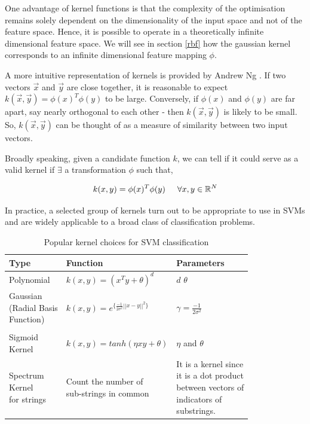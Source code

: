 \documentclass[final,3p,times,twocolumn]{elsarticle}
\begin{document}
One advantage of kernel functions is that the complexity of the optimisation remains solely dependent on the dimensionality of the input space and not of the feature space. Hence, it is possible to operate in a theoretically infinite dimensional feature space. We will see in section \ref{rbf} how the gaussian kernel corresponds to an infinite dimensional feature mapping $\phi$. 

A more intuitive representation of kernels is provided by Andrew Ng . If two vectors $\vec{x}$ and $\vec{y}$ are close together, it is reasonable to expect $k(\vec{x},\vec{y}) = \phi({x})^T\phi({y})$ to be large. Conversely, if $\phi({x})$ and $\phi({y})$ are far apart, say nearly orthogonal to each other - then $k(\vec{x},\vec{y})$  is likely to be small. So, $k(\vec{x},\vec{y})$ can be thought of as a measure of similarity between two input vectors. 

Broadly speaking, given a candidate function $k$, we can tell if it could serve as a valid kernel if $\exists$ a transformation $\phi$ such that, 

\begin{equation}
k(x,y) = \phi(x)^T\phi(y) \hspace{5mm} \forall x,y \in \mathbb{R}^N
\end{equation}

In practice, a selected group of kernels turn out to be appropriate to use in SVMs and are widely applicable to a broad class of classification problems.

\begin{table}[ht]
\caption{Popular kernel choices for SVM classification}
\begin{tabular}{p{2cm}p{3cm}p{2cm}}
\toprule
Type & Function & Parameters \\
\midrule
\rule[-2ex]{0pt}{2.5ex} Polynomial & $k(x,y) = (x^Ty + \theta)^d$ & $d$ $\theta$ \\
\pbox{10cm} {Gaussian \\(Radial Basis \\ Function)} &  $k(x,y) = e^{\lbrace\frac{-1}{2\sigma^2}||x-y||^2\rbrace}$ & $\gamma = \frac{-1}{2\sigma^2}$ \\ \\
\rule[-2ex]{0pt}{2.5ex} \pbox{20cm}{Sigmoid \\Kernel} & $k(x,y) = tanh(\eta xy + \theta)$ & $\eta$ and $\theta$ \\
\pbox{20cm} {Spectrum \\Kernel\\ for strings} & \pbox{20cm}{Count the number of \\ sub-strings in common} & \pbox{20cm}{It is a kernel since \\it is a dot product \\between vectors of \\indicators of \\substrings.} \\
\bottomrule
\end{tabular}
\label{kernels}
\end{table} 
\end{document}

